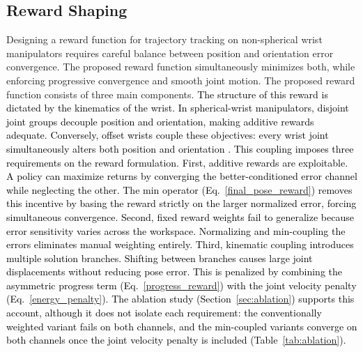 \documentclass[preprint,12pt]{elsarticle}
\begin{document}
\subsection{Reward Shaping}
\label{reward_function}
Designing a reward function for trajectory tracking on non-spherical wrist manipulators requires careful balance between position and orientation error convergence. The proposed reward function simultaneously minimizes both, while enforcing progressive convergence and smooth joint motion. The proposed reward function consists of three main components. \textcolor{black}{The structure of this reward is dictated by the kinematics of the wrist. In spherical-wrist manipulators, disjoint joint groups decouple position and orientation, making additive rewards adequate. Conversely, offset wrists couple these objectives: every wrist joint simultaneously alters both position and orientation \cite{li2021novel}. This coupling imposes three requirements on the reward formulation. First, additive rewards are exploitable. A policy can maximize returns by converging the better-conditioned error channel while neglecting the other. The min operator (Eq.~\eqref{final_pose_reward}) removes this incentive by basing the reward strictly on the larger normalized error, forcing simultaneous convergence. Second, fixed reward weights fail to generalize because error sensitivity varies across the workspace. Normalizing and min-coupling the errors eliminates manual weighting entirely. Third, kinematic coupling introduces multiple solution branches. Shifting between branches causes large joint displacements without reducing pose error. This is penalized by combining the asymmetric progress term (Eq.~\eqref{progress_reward}) with the joint velocity penalty (Eq.~\eqref{energy_penalty}). The ablation study (Section~\ref{sec:ablation}) supports this account, although it does not isolate each requirement: the conventionally weighted variant \textcolor{black}{fails on both channels, and the min-coupled variants converge on both channels once the joint velocity penalty is included (Table~\ref{tab:ablation})}.}


\end{document}
